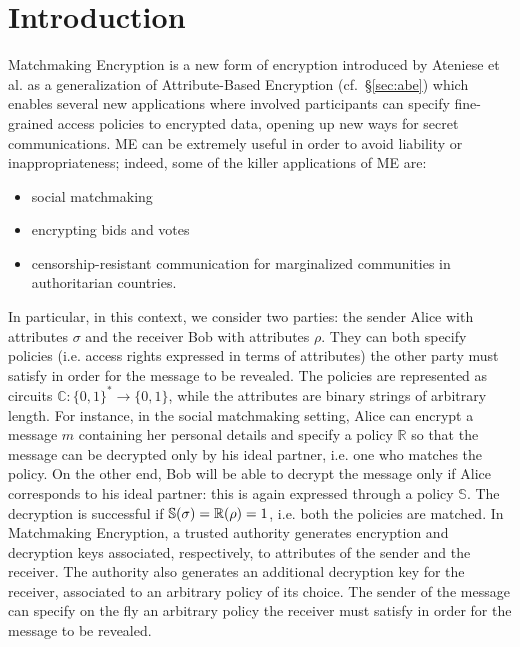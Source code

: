 \chapter{Introduction}
Matchmaking Encryption is a new form of encryption introduced by Ateniese et al. \cite{Ateniese} as a generalization of Attribute-Based Encryption (cf.\ \S\ref{sec:abe}) which enables several new applications where involved participants can specify fine-grained access policies to encrypted data, opening up new ways for secret communications.
\newline\newline
ME can be extremely useful in order to avoid liability or inappropriateness; indeed, some of the killer applications of ME are:
\begin{itemize}
    \item social matchmaking
    \item encrypting bids and votes
    \item censorship-resistant communication for marginalized communities in authoritarian countries.
\end{itemize}
In particular, in this context, we consider two parties: the sender Alice with attributes $\sigma$ and the receiver Bob with attributes $\rho$.
They can both specify policies (i.e. access rights expressed in terms of attributes) the other party must satisfy in order for the message to be revealed.
The policies are represented as circuits $\mathbb{C} : \{0, 1\}^* \to \{0, 1\}$, while the attributes are binary strings of arbitrary length.
For instance, in the social matchmaking setting, Alice can encrypt a message $m$ containing her personal details and specify a policy $\mathbb{R}$ so that the message can be decrypted only by his ideal partner, i.e. one who matches the policy.
On the other end, Bob will be able to decrypt the message only if Alice corresponds to his ideal partner: this is again expressed through a policy $\mathbb{S}$.
The decryption is successful if $\mathbb{S}(\sigma) = \mathbb{R}(\rho) = 1$, i.e. both the policies are matched.
\newline\newline
In Matchmaking Encryption, a trusted authority generates encryption and decryption keys associated, respectively, to attributes of the sender and the receiver.
The authority also generates an additional decryption key for the receiver, associated to an arbitrary policy of its choice.
The sender of the message can specify on the fly an arbitrary policy the receiver must satisfy in order for the message to be revealed.
